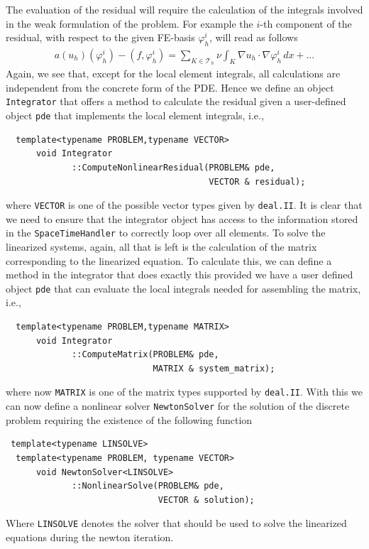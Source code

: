 \documentclass[prodmode,acmtoms]{acmsmall}
\numberwithin{equation}{section}
\renewcommand{\phi}{\varphi}
\newcommand{\deal}{\texttt{deal.II}}
\begin{document}
The evaluation of the residual will require the calculation of the integrals 
involved in the weak formulation of the problem. For example 
the $i$-th component of the residual, with respect to the given FE-basis 
$\phi_{h}^{i}$, will read as follows
\begin{align}\label{eq:residual_vector}
 a(u_h)(\phi_{h}^{i}) - (f,\phi_{h}^{i}) = \sum_{K\in \mathcal T_h} \nu\int_K \nabla u_h\cdot \nabla \phi_{h}^{i}\,dx + \ldots
 \end{align}
Again, we see that, except for the local element integrals, all 
calculations are independent from the concrete form of the PDE. 
Hence we define an object \texttt{Integrator}
that offers a method to calculate the residual given a user-defined 
object \texttt{pde} that implements the local element integrals, i.e.,
\begin{lstlisting}
  template<typename PROBLEM,typename VECTOR>
      void Integrator
             ::ComputeNonlinearResidual(PROBLEM& pde, 
                                        VECTOR & residual);
\end{lstlisting}
where \texttt{VECTOR} is one of the possible vector types given by \deal{}.
It is clear that we need to ensure that the integrator object has access
to the information stored in the \texttt{SpaceTimeHandler}
to correctly loop over all elements.
To solve the linearized systems, again, all that is left is the calculation
of the matrix corresponding to the linearized equation. To calculate this,
 we can define a method in the integrator that does exactly this provided
we have a user defined object \texttt{pde} that can evaluate the local 
integrals needed for assembling the matrix, i.e.,
\begin{lstlisting}
  template<typename PROBLEM,typename MATRIX>
      void Integrator
             ::ComputeMatrix(PROBLEM& pde, 
                             MATRIX & system_matrix);
\end{lstlisting}
where now \texttt{MATRIX} is one of the matrix types supported by \deal{}.
With this we can now define a nonlinear solver \texttt{NewtonSolver} 
for the solution of the discrete problem requiring the existence of the 
following function
\begin{lstlisting}
 template<typename LINSOLVE>
  template<typename PROBLEM, typename VECTOR>
      void NewtonSolver<LINSOLVE>
             ::NonlinearSolve(PROBLEM& pde, 
                              VECTOR & solution);
\end{lstlisting}
Where \texttt{LINSOLVE} denotes the solver that should be used to solve the 
linearized equations during the newton iteration.
\end{document}
